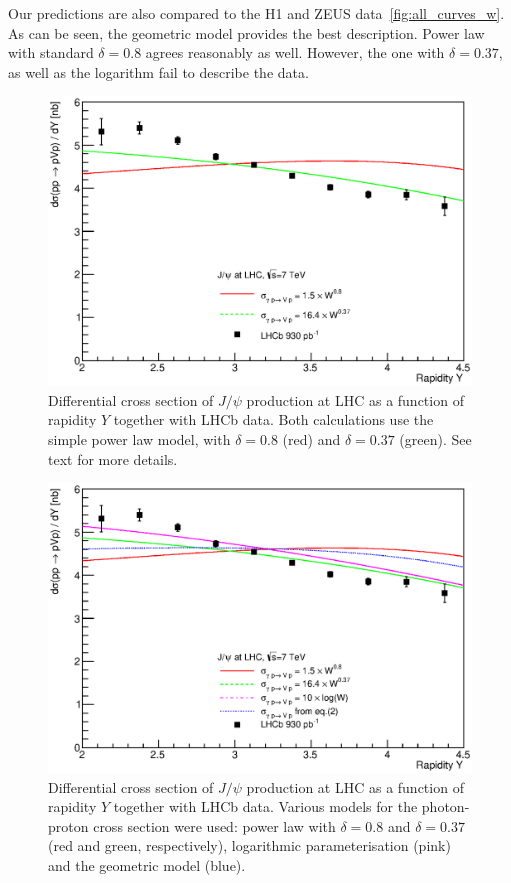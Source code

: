 \documentclass[12pt]{article}
\begin{document}
Our predictions are also compared to the H1 and ZEUS data~\ref{fig:all_curves_w}.
As can be seen, the geometric model provides the best description.
Power law with standard $\delta=0.8$ agrees reasonably as well.
However, the one with $\delta=0.37$, as well as the logarithm fail to describe the data.

\begin{figure}[!h]
\centering
 \includegraphics[width=.8\textwidth]{figures/dSigma_dy_comparison2.eps}
 \caption{Differential cross section of $J/\psi$ production at LHC as a function of rapidity $Y$ together with LHCb data.
          Both calculations use the simple power law model, with $\delta=0.8$ (red) and $\delta=0.37$ (green).
          See text for more details.}
 \label{fig:delta_fit}
\end{figure}

\begin{figure}[p]
\centering
 \includegraphics[width=.8\textwidth]{figures/dSigma_dy_comparison3.eps}
 \caption{Differential cross section of $J/\psi$ production at LHC as a function of rapidity $Y$ together with LHCb data.
          Various models for the photon-proton cross section were used: power law with $\delta=0.8$ and $\delta=0.37$ (red and green, respectively),
          logarithmic parameterisation (pink) and the geometric model (blue).
          }
  \label{fig:all_curves}
\end{figure}
\end{document}
